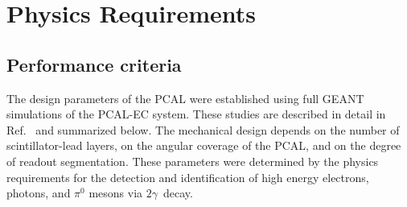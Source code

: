 \section{Physics Requirements}

\subsection{Performance criteria}
The design parameters of the PCAL were established using full GEANT simulations of the PCAL-EC system. These studies are described in detail in Ref.~\cite{2007001} and summarized below. The mechanical design depends on the number of scintillator-lead layers, on the angular coverage of the PCAL, and on the degree of readout segmentation.  These parameters were determined by the physics requirements for the detection and identification of high energy electrons, photons, and $\pi^{0}$ mesons via $2\gamma$\ decay.

